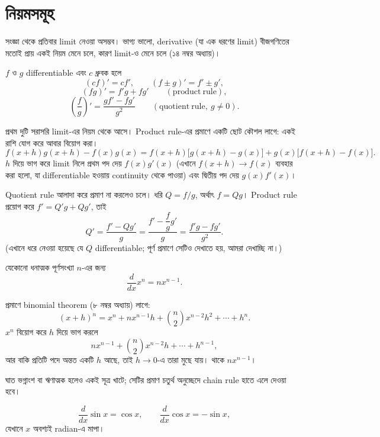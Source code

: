\documentclass[11pt]{article}
\begin{document}
\section{নিয়মসমূহ}

সংজ্ঞা থেকে প্রতিবার limit নেওয়া অসম্ভব। ভাগ্য ভালো, derivative (যা এক ধরণের limit) বীজগণিতের মতোই প্রায় একই নিয়ম মেনে চলে, কারণ limit-ও মেনে চলে (১৪ নম্বর অধ্যায়)।

\begin{idea}[মৌলিক নিয়ম]
$f$ ও $g$ differentiable এবং $c$ ধ্রুবক হলে
\[
  (cf)' = cf', \qquad (f \pm g)' = f' \pm g' ,
\]
\[
  (fg)' = f'g + fg' \qquad (\mathrm{product\ rule}) ,
\]
\[
  \left( \frac{f}{g} \right)' = \frac{gf' - fg'}{g^{2}}
  \qquad (\mathrm{quotient\ rule}, \ g \neq 0) .
\]
\end{idea}

প্রথম দুটি সরাসরি limit-এর নিয়ম থেকে আসে। Product rule-এর প্রমাণে একটি ছোট
কৌশল লাগে: একই রাশি যোগ করে আবার বিয়োগ করা।
\[
  f(x+h)g(x+h) - f(x)g(x)
  = f(x+h)\bigl[ g(x+h)-g(x) \bigr] + g(x)\bigl[ f(x+h)-f(x) \bigr] .
\]
$h$ দিয়ে ভাগ করে limit নিলে প্রথম পদ দেয় $f(x)g'(x)$ (এখানে
$f(x+h) \to f(x)$ ব্যবহার করা হলো, যা differentiable হওয়ায় continuity থেকে
পাওয়া) এবং দ্বিতীয় পদ দেয় $g(x)f'(x)$।

Quotient rule আলাদা করে প্রমাণ না করলেও চলে। ধরি $Q = f/g$, অর্থাৎ $f = Qg$।
Product rule প্রয়োগ করে $f' = Q'g + Qg'$, তাই
\[
  Q' = \frac{f' - Qg'}{g} = \frac{f' - \dfrac{f}{g}g'}{g}
     = \frac{f'g - fg'}{g^{2}} .
\]
(এখানে ধরে নেওয়া হয়েছে যে $Q$ differentiable; পূর্ণ প্রমাণে সেটিও দেখাতে হয়,
আমরা দেখাচ্ছি না।)

\begin{idea}
যেকোনো ধনাত্মক পূর্ণসংখ্যা $n$-এর জন্য
\[
  \frac{d}{dx}x^{n} = n x^{n-1} .
\]
\end{idea}

প্রমাণে binomial theorem (৮ নম্বর অধ্যায়) লাগে:
\[
  (x+h)^{n} = x^{n} + n x^{n-1}h + \binom{n}{2}x^{n-2}h^{2} + \cdots + h^{n} .
\]
$x^{n}$ বিয়োগ করে $h$ দিয়ে ভাগ করলে
\[
  n x^{n-1} + \binom{n}{2}x^{n-2}h + \cdots + h^{n-1} ,
\]
আর বাকি প্রতিটি পদে অন্তত একটি $h$ আছে, তাই $h \to 0$-এ তারা মুছে যায়। থাকে
$n x^{n-1}$।

ঘাত ভগ্নাংশ বা ঋণাত্মক হলেও একই সূত্র খাটে; সেটির প্রমাণ চতুর্থ অনুচ্ছেদে
chain rule হাতে এলে দেওয়া হবে।

\begin{idea}
\[
  \frac{d}{dx}\sin x = \cos x, \qquad \frac{d}{dx}\cos x = -\sin x ,
\]
যেখানে $x$ অবশ্যই radian-এ মাপা।
\end{idea}
\end{document}

